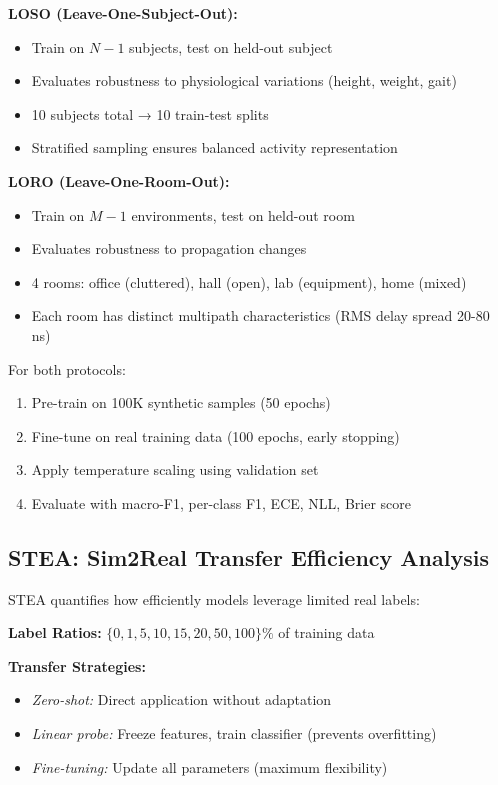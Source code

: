 \documentclass[journal]{IEEEtran}
\begin{document}
\textbf{LOSO (Leave-One-Subject-Out):}
\begin{itemize}
\item Train on $N-1$ subjects, test on held-out subject
\item Evaluates robustness to physiological variations (height, weight, gait)
\item 10 subjects total → 10 train-test splits
\item Stratified sampling ensures balanced activity representation
\end{itemize}

\textbf{LORO (Leave-One-Room-Out):}
\begin{itemize}
\item Train on $M-1$ environments, test on held-out room
\item Evaluates robustness to propagation changes
\item 4 rooms: office (cluttered), hall (open), lab (equipment), home (mixed)
\item Each room has distinct multipath characteristics (RMS delay spread 20-80 ns)
\end{itemize}

For both protocols:
\begin{enumerate}
\item Pre-train on 100K synthetic samples (50 epochs)
\item Fine-tune on real training data (100 epochs, early stopping)
\item Apply temperature scaling using validation set
\item Evaluate with macro-F1, per-class F1, ECE, NLL, Brier score
\end{enumerate}

\subsection{STEA: Sim2Real Transfer Efficiency Analysis}
STEA quantifies how efficiently models leverage limited real labels:

\textbf{Label Ratios:} $\{0, 1, 5, 10, 15, 20, 50, 100\}\%$ of training data

\textbf{Transfer Strategies:}
\begin{itemize}
\item \textit{Zero-shot:} Direct application without adaptation
\item \textit{Linear probe:} Freeze features, train classifier (prevents overfitting)
\item \textit{Fine-tuning:} Update all parameters (maximum flexibility)
\end{itemize}
\end{document}

